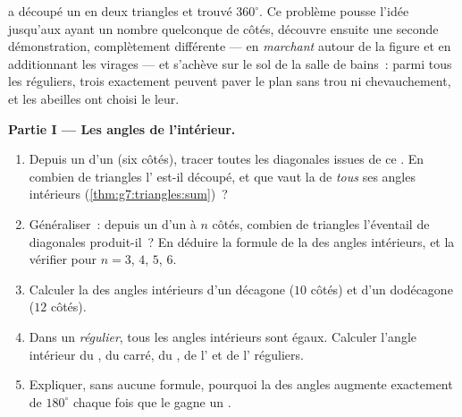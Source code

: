 \begin{problem}
\label{pb:g7:triangles:1}
 a découpé un  en deux
triangles et trouvé $360^\circ$. Ce problème pousse l'idée jusqu'aux
 ayant un nombre quelconque de côtés, découvre ensuite une
seconde démonstration, complètement différente --- en \emph{marchant}
autour de la figure et en additionnant les virages --- et s'achève
sur le sol de la salle de bains~: parmi tous les  réguliers,
trois exactement peuvent paver le plan sans trou ni chevauchement, et
les abeilles ont choisi le leur.

\medskip
\noindent\textbf{Partie I --- Les angles de l'intérieur.}
\begin{enumerate}
  \item Depuis un  d'un  (six côtés), tracer toutes
        les diagonales issues de ce . En combien de triangles
        l' est-il découpé, et que vaut la  de
        \emph{tous} ses angles intérieurs
        (\cref{thm:g7:triangles:sum})~?
  \item Généraliser~: depuis un  d'un  à $n$ côtés,
        combien de triangles l'éventail de diagonales
        produit-il~? En déduire la formule de la  des angles
        intérieurs, et la vérifier pour $n = 3$, $4$, $5$, $6$.
  \item Calculer la  des angles intérieurs d'un décagone ($10$
        côtés) et d'un dodécagone ($12$ côtés).
  \item Dans un  \emph{régulier}, tous les angles intérieurs
        sont égaux. Calculer l'angle intérieur du , du carré, du , de l' et de
        l' réguliers.
  \item Expliquer, sans aucune formule, pourquoi la  des angles
        augmente exactement de $180^\circ$ chaque fois que le
         gagne un .
\end{enumerate}


\end{problem}
